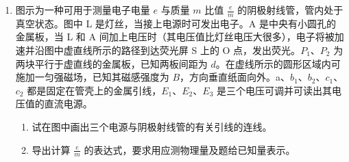 \documentclass[\gkver]{gaokaozhenti}
\begin{document}
\begin{enumerate}
\item
图示为一种可用于测量电子电量 $e$ 与质量 $m$ 比值 $\frac{e}{m}$ 的阴极射线管，管内处于真空状态。图中 L 是灯丝，当接上电源时可发出电子。A 是中央有小圆孔的金属板，当 L 和 A 间加上电压时（其电压值比灯丝电压大很多），电子将被加速并沿图中虚直线所示的路径到达荧光屏 S 上的 O 点，发出荧光。$P_{1}$、$P_{2}$ 为两块平行于虚直线的金属板，已知两板间距为 $d$。在虚线所示的圆形区域内可施加一匀强磁场，已知其磁感强度为 $B$，方向垂直纸面向外。a、$b_{1}$、$b_{2}$、$c_{1}$、$c_{2}$ 都是固定在管壳上的金属引线，$E_{1}$、$E_{2}$、$E_{3}$ 是三个电压可调并可读出其电压值的直流电源。
\begin{enumerate}
	\item
	试在图中画出三个电源与阴极射线管的有关引线的连线。

	\item
	导出计算 $\frac{e}{m}$ 的表达式，要求用应测物理量及题给已知量表示。
\end{enumerate}


\end{enumerate}
\end{document}
